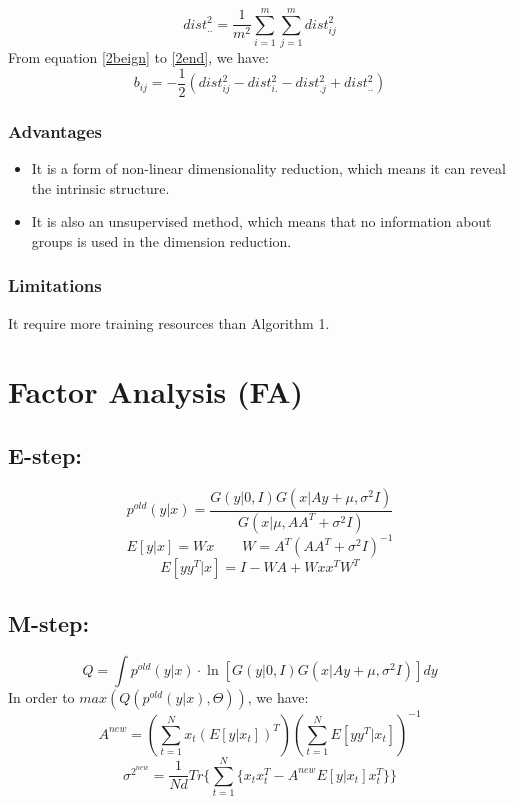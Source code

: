 \documentclass{article}
\theoremstyle{definition}
\numberwithin{equation}{section}
\numberwithin{figure}{section}
\begin{document}
\begin{equation}
\label{2end}
dist_{..}^2=\frac{1}{m^2}\sum^m_{i=1}\sum^m_{j=1}dist_{ij}^2
\end{equation}
From equation \ref{2beign} to \ref{2end}, we have:
\begin{equation}
\label{2get}
b_{ij}=-\frac{1}{2}(dist_{ij}^2-dist_{i.}^2-dist_{.j}^2+dist_{..}^2)
\end{equation}

\subsubsection{Advantages}
\begin{itemize}
\item It is a form of non-linear dimensionality reduction, which means it can reveal the intrinsic structure.
\item It is also an unsupervised method, which means that no information about groups is used in the dimension reduction.
\end{itemize}
\subsubsection{Limitations}
It require more training resources than Algorithm 1.

\section{Factor Analysis (FA)}
\subsection{E-step:}
\begin{equation*}
p^{old}(y|x)=\frac{G(y|0,I)G(x|Ay+\mu,\sigma^2I)}{G(x|\mu,AA^T+\sigma^2I)}
\end{equation*}
\begin{equation*}
E[y|x]=Wx \qquad W=A^T(AA^T+\sigma^2I)^{-1}
\end{equation*}
\begin{equation*}
E[yy^T|x]=I-WA+Wxx^TW^T
\end{equation*}
\subsection{M-step:}
\begin{equation*}
Q=\int p^{old}(y|x) \cdot \ln [G(y|0,I)G(x|Ay+\mu,\sigma^2I)]dy
\end{equation*}
In order to $max(Q(p^{old}(y|x),\Theta))$, we have:
\begin{equation*}
A^{new}=(\sum^N_{t=1}x_t(E[y|x_t])^T)(\sum^N_{t=1}E[yy^T|x_t])^{-1}
\end{equation*}
\begin{equation*}
\sigma^{2^{new}}=\frac{1}{Nd}Tr\bigg\{\sum^N_{t=1}\{x_tx_t^T-A^{new}E[y|x_t]x_t^T\}\bigg\}
\end{equation*}
\end{document}
